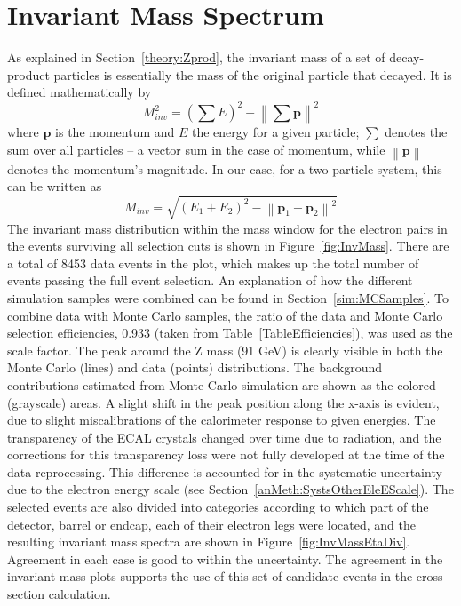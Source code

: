 \section{Invariant Mass Spectrum} %
\label{anMeth:invmass}
As explained in Section~\ref{theory:Zprod}, %
the invariant mass of a set of decay-product particles is 
essentially the mass of the original particle that decayed. 
It is defined mathematically by %
\[
M_{inv}^2 = \left( \sum E \right)^2 - \left\| \sum \mathbf{p} \right\|^2
\]
where $ \mathbf{p} $ is the momentum 
and $ E $ the energy for a given particle; 
$ \sum $ denotes the sum over all particles 
-- a vector sum in the case of momentum, 
while $\left\| \mathbf{p} \right\|$ denotes the momentum's magnitude.  
In our case, for a two-particle system, this can be written as 
\[
M_{inv} = \sqrt{ \left(E_1 + E_2\right)^2 - \left\|\mathbf{p}_1 + \mathbf{p}_2\right\|^2 }
\]
The invariant mass distribution within the mass window 
for the electron pairs 
in the events surviving all selection cuts is shown in 
Figure~\ref{fig:InvMass}.  
There are a total of 8453 data events in the plot, 
which makes up the total number of events passing 
the full event selection.  
An explanation of how the different simulation 
samples were combined can be 
found in Section~\ref{sim:MCSamples}.  
To combine data with Monte Carlo samples, 
the ratio of the data and Monte Carlo selection efficiencies, 
0.933 (taken from Table~\ref{TableEfficiencies}), 
was used as the scale factor.  
The peak around the Z mass (91 GeV) is clearly visible 
in both the Monte Carlo (lines) and data (points) distributions.  
The background contributions estimated from Monte Carlo simulation 
are shown as the colored (grayscale) areas.  
A slight shift in the peak position along the x-axis is 
evident, due to slight miscalibrations of 
the calorimeter response to given energies.  
The transparency of the ECAL crystals changed over time 
due to radiation, 
and the corrections for this transparency loss 
were not fully developed at the time of the 
data reprocessing.  %
This difference is accounted for in the 
systematic uncertainty due to the electron energy scale 
(see Section~\ref{anMeth:SystsOtherEleEScale}).  
The selected events are also divided into categories according 
to which part of the detector, barrel or endcap, 
each of their electron legs were located, 
and the resulting invariant mass spectra are 
shown in Figure~\ref{fig:InvMassEtaDiv}.  
Agreement in each case is good to within the 
uncertainty.  
The agreement in the invariant mass plots supports 
the use of this set of candidate events in 
the cross section calculation.  


